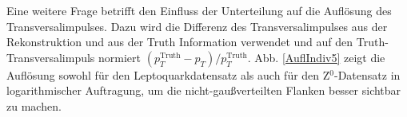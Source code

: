 %
%
%
%
Eine weitere Frage betrifft den Einfluss der Unterteilung auf die Auflösung des Transversalimpulses. Dazu wird die Differenz des Transversalimpulses aus der Rekonstruktion und aus der Truth Information verwendet und auf den Truth-Trans\-ver\-sal\-impuls normiert $(p_T^{\text{Truth}}-p_T)/p_T^{\text{Truth}}$. Abb. \ref{AuflIndiv5} zeigt die Auflösung sowohl für den Leptoquarkdatensatz als auch für den Z$^0$-Datensatz in logarithmischer Auftragung, um die nicht-gaußverteilten Flanken besser sichtbar zu machen. 
